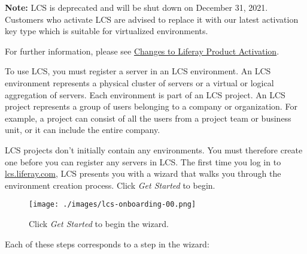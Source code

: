 \noindent\hrulefill

\textbf{Note:} LCS is deprecated and will be shut down on December 31,
2021. Customers who activate LCS are advised to replace it with our
latest activation key type which is suitable for virtualized
environments.

For further information, please see
\href{https://help.liferay.com/hc/en-us/articles/4402347960845-Changes-to-Liferay-Product-Activation}{Changes
to Liferay Product Activation}.

\noindent\hrulefill

To use LCS, you must register a server in an LCS environment. An LCS
environment represents a physical cluster of servers or a virtual or
logical aggregation of servers. Each environment is part of an LCS
project. An LCS project represents a group of users belonging to a
company or organization. For example, a project can consist of all the
users from a project team or business unit, or it can include the entire
company.

LCS projects don't initially contain any environments. You must
therefore create one before you can register any servers in LCS. The
first time you log in to
\href{https://lcs.liferay.com}{lcs.liferay.com}, LCS presents you with a
wizard that walks you through the environment creation process. Click
\emph{Get Started} to begin.

\begin{figure}
\centering
\texttt{[image: ./images/lcs-onboarding-00.png]}
\caption{Click \emph{Get Started} to begin the wizard.}
\end{figure}

Each of these steps corresponds to a step in the wizard:

